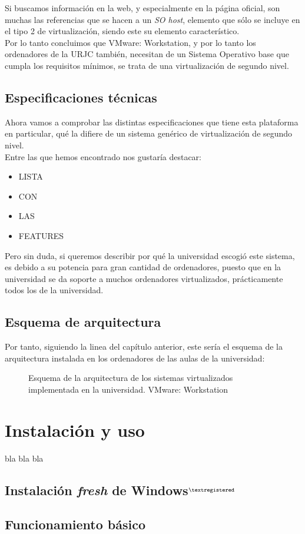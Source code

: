 Si buscamos información en la web\cite{refvmware1}, y especialmente en la página oficial\cite{vmwareworkguiaso}\cite{refvmware2}, son muchas las referencias que se hacen a un \emph{SO host}, elemento que sólo se incluye en el tipo 2 de virtualización, siendo este su elemento característico.\\

Por lo tanto concluimos que VMware: Workstation, y por lo tanto los ordenadores de la URJC también, necesitan de un Sistema Operativo base que cumpla los requisitos mínimos, se trata de una virtualización de segundo nivel.

\subsection{Especificaciones técnicas}
Ahora vamos a comprobar las distintas especificaciones que tiene esta plataforma en particular, qué la difiere de un sistema genérico de virtualización de segundo nivel.\\

Entre las que hemos encontrado nos gustaría destacar:

\begin{itemize}
\item LISTA
\item CON
\item LAS
\item FEATURES
\end{itemize}

Pero sin duda, si queremos describir por qué la universidad escogió este sistema, es debido a su potencia para gran cantidad de ordenadores, puesto que en la universidad se da soporte a muchos ordenadores virtualizados, prácticamente todos los de la universidad.

\subsection{Esquema de arquitectura}
Por tanto, siguiendo la linea del capítulo anterior, este sería el esquema de la arquitectura instalada en los ordenadores de las aulas de la universidad:

\begin{figure}[H]
\begin{center}
\end{center}
\caption[Arquitectura VMware: Workstation]{Esquema de la arquitectura de los sistemas virtualizados implementada en la universidad. VMware: Workstation}
\end{figure}

\section{Instalación y uso}
bla bla bla

\subsection{Instalación \emph{fresh} de Windows$^{\textregistered}$}

\subsection{Funcionamiento básico}